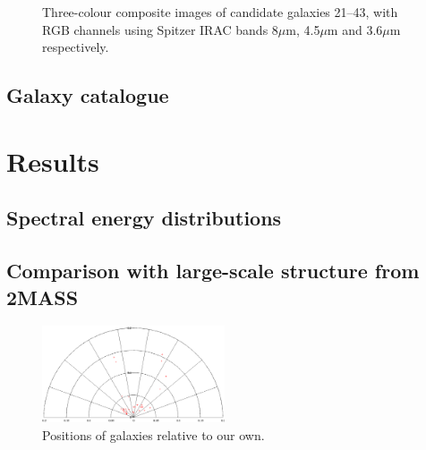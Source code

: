 \documentclass[times,usenatbib]{mn2e}
\begin{document}
\begin{figure}
\begin{center}
\caption{Three-colour composite images of candidate galaxies 21--43, with RGB channels using Spitzer IRAC bands 8$\mu$m, 4.5$\mu$m and 3.6$\mu$m respectively.}
\label{gallery2}
\end{center}
\end{figure} 

\subsection{Galaxy catalogue}

\section{Results}

\subsection{Spectral energy distributions}

\subsection{Comparison with large-scale structure from 2MASS}

\begin{figure}
\includegraphics[width=0.48\textwidth]{./figures/polar.eps}
\caption{Positions of galaxies relative to our own.}
\label{polar}
\end{figure}
\end{document}
